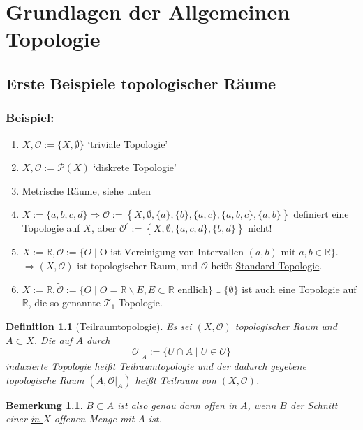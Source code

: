 \documentclass[a4paper,11pt,notitlepage]{report}
\newtheorem{definition}{Definition}[chapter]
\newtheorem{remark}{Bemerkung}[chapter]
\newcommand{\R}{{\ensuremath{\mathbb{R}}}}
\newcommand{\OO}{{\ensuremath{\mathcal{O}}}}
\newenvironment{bsp}[1]
{
\setlength{\fboxsep}{10pt}
\subsection*{Beispiel: #1}
\begin{upshape}
}
{
\end{upshape}
}
\begin{document}
\newpage
\chapter{Grundlagen der Allgemeinen Topologie}
\section{Erste Beispiele topologischer Räume}
\begin{bsp}{}
	\begin{enumerate}[(1)]
		\item $X, \OO := \{X, \emptyset\}$ \underline{`triviale Topologie'}
		\item $X, \OO := \mathcal{P}(X)$ \underline{`diskrete Topologie'}
		\item Metrische Räume, siehe unten
		\item $X:= \{a,b,c,d\} \Rightarrow \OO := \left\{X, \emptyset, \{a\}, \{b\}, \{a,c\}, \{a,b,c\}, \{a,b\} \right \}$ definiert eine Topologie auf $X$, aber $\OO^\prime:= \left \{ X, \emptyset, \{a,c,d\}, \{b,d\} \right \}$ nicht!
		\item $X := \R, \OO := \{O \mid \text{O ist Vereinigung von Intervallen } (a,b) \text{ mit } a,b \in \R\}$. $\Rightarrow (X, \OO) \text{ ist topologischer Raum}$, und $\OO$ heißt \underline{Standard-Topologie}.
		\item $X:= \R, \tilde{\OO} := \{O \mid O = \R \backslash E, E \subset \R \text{ endlich}\} \cup \{\emptyset\}$ ist auch eine Topologie auf $\R$, die so genannte $\mathcal{T}_1$-Topologie.
	\end{enumerate}
\end{bsp}

\begin{definition}[Teilraumtopologie]
Es sei $(X, \OO)$ topologischer Raum und $A \subset X$. Die auf $A$ durch
$$\OO \Big |_{A} := \{U \cap A \mid U \in \OO \}$$
induzierte Topologie heißt \underline{Teilraumtopologie} und der dadurch gegebene topologische Raum $(A, \OO \Big |_{A})$ heißt \underline{Teilraum} von $(X, \OO)$.
\end{definition}

\begin{remark}
$B \subset A$ ist also genau dann \underline{offen \underline{in $A$}}, wenn $B$ der Schnitt einer \underline{in $X$} offenen Menge mit $A$ ist.
\end{remark}
\end{document}
